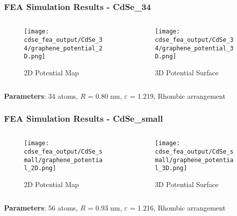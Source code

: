 \documentclass{beamer}
\begin{document}
\begin{frame}
\frametitle{FEA Simulation Results - CdSe\_34}
\begin{columns}
\begin{column}{0.5\textwidth}
\begin{figure}
\centering
\texttt{[image: cdse\_fea\_output/CdSe\_34/graphene\_potential\_2D.png]}
\caption{2D Potential Map}
\end{figure}
\end{column}
\begin{column}{0.5\textwidth}
\begin{figure}
\centering
\texttt{[image: cdse\_fea\_output/CdSe\_34/graphene\_potential\_3D.png]}
\caption{3D Potential Surface}
\end{figure}
\end{column}
\end{columns}

\textbf{Parameters}: 34 atoms, $R$ = 0.80 nm, $\varepsilon$ = 1.219, Rhombic arrangement
\end{frame}

\begin{frame}
\frametitle{FEA Simulation Results - CdSe\_small}
\begin{columns}
\begin{column}{0.5\textwidth}
\begin{figure}
\centering
\texttt{[image: cdse\_fea\_output/CdSe\_small/graphene\_potential\_2D.png]}
\caption{2D Potential Map}
\end{figure}
\end{column}
\begin{column}{0.5\textwidth}
\begin{figure}
\centering
\texttt{[image: cdse\_fea\_output/CdSe\_small/graphene\_potential\_3D.png]}
\caption{3D Potential Surface}
\end{figure}
\end{column}
\end{columns}

\textbf{Parameters}: 56 atoms, $R$ = 0.93 nm, $\varepsilon$ = 1.216, Rhombic arrangement
\end{frame}
\end{document}
